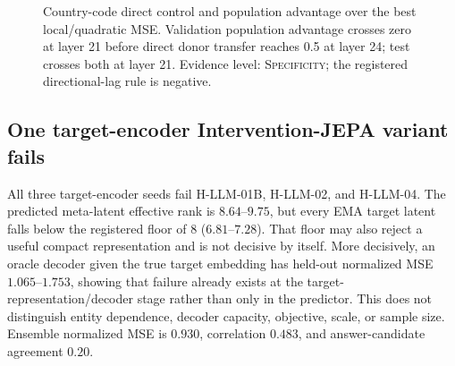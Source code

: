 \documentclass[10pt]{article}
\newcommand{\level}[1]{{\scriptsize\textsc{#1}}}
\begin{document}
\begin{figure}[t]
\centering
\begin{minipage}{0.48\linewidth}
\centering
{}
\end{minipage}\hfill
\begin{minipage}{0.48\linewidth}
\centering
{}
\end{minipage}
\caption{Country-code direct control and population advantage over the best
local/quadratic MSE.  Validation population advantage crosses zero at layer 21
before direct donor transfer reaches 0.5 at layer 24; test crosses both at
layer 21.  Evidence level: \level{Specificity}; the registered directional-lag
rule is negative.}
\label{fig:country-layer}
\end{figure}

\subsection{One target-encoder Intervention-JEPA variant fails}

All three target-encoder seeds fail H-LLM-01B, H-LLM-02, and H-LLM-04.  The
predicted meta-latent effective rank is $8.64$--$9.75$, but every EMA target
latent falls below the registered floor of 8 ($6.81$--$7.28$).  That floor may
also reject a useful compact representation and is not decisive by itself.  More
decisively, an oracle decoder given the true target embedding has held-out
normalized MSE $1.065$--$1.753$, showing that failure already exists at the
target-representation/decoder stage rather than only in the predictor.  This
does not distinguish entity dependence, decoder capacity, objective, scale, or
sample size.  Ensemble normalized MSE is $0.930$,
correlation $0.483$, and answer-candidate agreement $0.20$.
\end{document}
